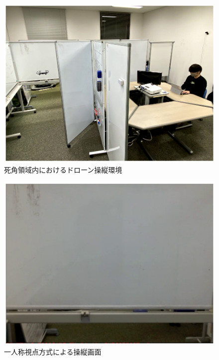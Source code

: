 \documentclass[submit,techrep]{ipsj}
\begin{document}
\begin{figure}[tb]
\centering
\includegraphics[width=\linewidth]{img/03_enviroment.eps}
\caption{死角領域内におけるドローン操縦環境}
\label{fig:03_enviroment}
\end{figure}

\begin{figure}[tb]
  \centering
  \includegraphics[width=\linewidth]{img/03_fpv.eps}
  \caption{一人称視点方式による操縦画面}
  \label{fig:03_FPV}
\end{figure}
\end{document}
